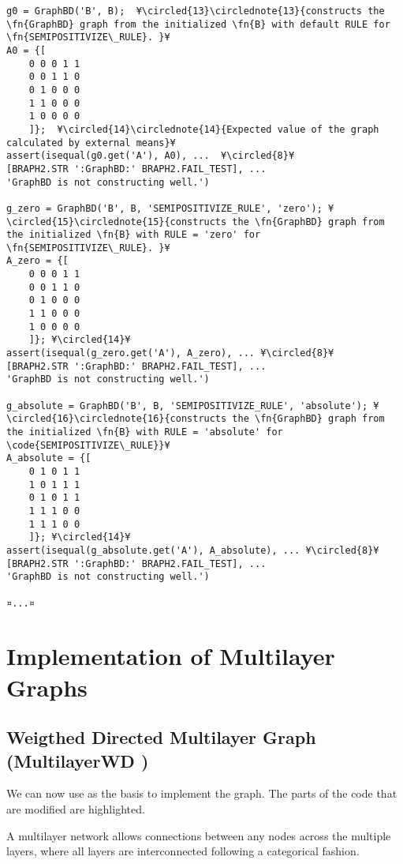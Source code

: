 \documentclass{tufte-handout}
\begin{document}
\begin{lstlisting}
g0 = GraphBD('B', B);  ¥\circled{13}\circlednote{13}{constructs the \fn{GraphBD} graph from the initialized \fn{B} with default RULE for \fn{SEMIPOSITIVIZE\_RULE}. }¥
A0 = {[
	0 0 0 1 1
	0 0 1 1 0
	0 1 0 0 0
	1 1 0 0 0
	1 0 0 0 0
	]};  ¥\circled{14}\circlednote{14}{Expected value of the graph calculated by external means}¥
assert(isequal(g0.get('A'), A0), ...  ¥\circled{8}¥
[BRAPH2.STR ':GraphBD:' BRAPH2.FAIL_TEST], ...
'GraphBD is not constructing well.')

g_zero = GraphBD('B', B, 'SEMIPOSITIVIZE_RULE', 'zero'); ¥\circled{15}\circlednote{15}{constructs the \fn{GraphBD} graph from the initialized \fn{B} with RULE = 'zero' for \fn{SEMIPOSITIVIZE\_RULE}. }¥
A_zero = {[
	0 0 0 1 1
	0 0 1 1 0
	0 1 0 0 0
	1 1 0 0 0
	1 0 0 0 0
	]}; ¥\circled{14}¥
assert(isequal(g_zero.get('A'), A_zero), ... ¥\circled{8}¥
[BRAPH2.STR ':GraphBD:' BRAPH2.FAIL_TEST], ...
'GraphBD is not constructing well.')

g_absolute = GraphBD('B', B, 'SEMIPOSITIVIZE_RULE', 'absolute'); ¥\circled{16}\circlednote{16}{constructs the \fn{GraphBD} graph from the initialized \fn{B} with RULE = 'absolute' for \code{SEMIPOSITIVIZE\_RULE}}¥
A_absolute = {[
	0 1 0 1 1
	1 0 1 1 1
	0 1 0 1 1
	1 1 1 0 0
	1 1 1 0 0
	]}; ¥\circled{14}¥
assert(isequal(g_absolute.get('A'), A_absolute), ... ¥\circled{8}¥
[BRAPH2.STR ':GraphBD:' BRAPH2.FAIL_TEST], ...
'GraphBD is not constructing well.')

¤...¤
\end{lstlisting}

\clearpage
\section{Implementation of Multilayer Graphs}

\subsection{Weigthed Directed Multilayer Graph (MultilayerWD )}

We can now use  as the basis to implement the  graph. The parts of the code that are modified are highlighted.

A multilayer network allows connections between any nodes across the multiple layers, where all layers are interconnected following a categorical fashion.
\end{document}
